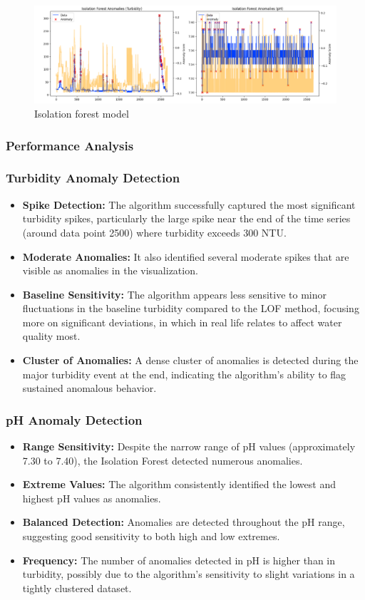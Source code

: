 \documentclass[12pt]{report}
\begin{document}
\begin{figure}[h]
    \centering
    \includegraphics[width=1 \linewidth]{isolatio_forest_model.png}
    \caption{Isolation forest  model}
    \label{fig:enter-label}
\end{figure}
\subsubsection*{Performance Analysis}
\subsubsection{Turbidity Anomaly Detection}
\begin{itemize}
    \item \textbf{Spike Detection:} The algorithm successfully captured the most significant turbidity spikes, particularly the large spike near the end of the time series (around data point 2500) where turbidity exceeds 300 NTU.
    \item \textbf{Moderate Anomalies:} It also identified several moderate spikes that  are  visible  as  anomalies in the  visualization. 
    \item \textbf{Baseline Sensitivity:} The algorithm appears less sensitive to minor fluctuations in the baseline turbidity compared to the LOF method, focusing more on significant deviations, in which in real life  relates  to affect  water  quality most. 
    \item \textbf{Cluster of Anomalies:} A dense cluster of anomalies is detected during the major turbidity event at the end, indicating the algorithm's ability to flag sustained anomalous behavior.
\end{itemize}

\subsubsection{pH Anomaly Detection}
\begin{itemize}
    \item \textbf{Range Sensitivity:} Despite the narrow range of pH values (approximately 7.30 to 7.40), the Isolation Forest detected numerous anomalies.
    \item \textbf{Extreme Values:} The algorithm consistently identified the lowest and highest pH values as anomalies.
    \item \textbf{Balanced Detection:} Anomalies are detected throughout the pH range, suggesting good sensitivity to both high and low extremes.
    \item \textbf{Frequency:} The number of anomalies detected in pH is higher than in turbidity, possibly due to the algorithm's sensitivity to slight variations in a tightly clustered dataset.
\end{itemize}
\end{document}
